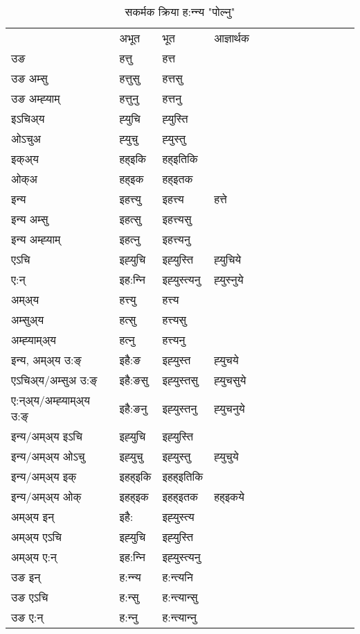 \begin{table}[H]
\label{utt.vt} \centering
\caption{सकर्मक क्रिया  ह:न्‍न्य  "पोल्नु"  }
\begin{tabular}{l|l|l|l|l|l|l|l|l|l|l|l|l}  \toprule
&अभूत & भूत & आज्ञार्थक \\ 
उङ &हत्तु &हत्त \\ 
उङ अम्सु&हत्तुसु &हत्तसु \\ 
उङ अम्ह्‍याम्&हत्तुनु &हत्तनु \\ 
इऽचिअ्य &ह्‍युचि &ह्‍युस्ति   \\ 
ओऽचुअ        &ह्‍युचु &ह्‍युस्तु   \\ 
इक्अ्य&हह्इकि &हह्इतिकि   \\ 
ओक्अ &हह्इक &हह्इतक   \\ 
इन्य & इहत्त्यु  & इहत्त्य &हत्ते  \\ 
इन्य अम्सु& इहत्सु  & इहत्त्यसु   \\ 
इन्य अम्ह्‍याम्& इहत्‍नु  & इहत्त्यनु   \\ 
एऽचि & इह्‍युचि & इह्‍युस्ति &ह्‍युचिये    \\ 
ए:न् & इह:न्‍नि  & इह्‍युस्त्यनु &ह्‍युस्‍नुये  \\ 
अम्अ्य & हत्त्यु  & हत्त्य  \\ 
अम्सुअ्य & हत्सु & हत्त्यसु  \\ 
अम्ह्‍याम्अ्य & हत्‍नु  & हत्त्यनु \\ 
\midrule
इन्य, अम्अ्य उ:ङ्‌ &इहै:ङ &इह्‍युस्त &ह्‍युचये \\ 
एऽचिअ्य/अम्सुअ उ:ङ्‌ &इहै:ङसु &इह्‍युस्तसु &ह्‍युचसुये \\ 
ए:न्अ्य/अम्ह्‍याम्अ्य उ:ङ्‌ &इहै:ङनु &इह्‍युस्तनु &ह्‍युचनुये \\ 
इन्य/अम्अ्य इऽचि &इह्‍युचि &इह्‍युस्ति    \\ 
इन्य/अम्अ्य ओऽचु &इह्‍युचु &इह्‍युस्तु  &ह्‍युचुये  \\ 
इन्य/अम्अ्य इक् &इहह्इकि &इहह्इतिकि   \\ 
इन्य/अम्अ्य ओक् &इहह्इक &इहह्इतक  &हह्इकये  \\ 
अम्अ्य इन् & इहै: & इह्‍युस्त्य   \\ 
अम्अ्य एऽचि & इह्‍युचि & इह्‍युस्ति    \\ 
अम्अ्य ए:न् & इह:न्‍नि  & इह्‍युस्त्यनु  \\ 
\midrule
उङ इन् & ह:न्‍न्य  & ह:न्त्यनि  \\ 
उङ एऽचि & ह:न्सु  & ह:न्त्यान्सु   \\ 
उङ ए:न्& ह:न्‍नु  & ह:न्त्यान्‍नु   \\ 
\bottomrule
\end{tabular}
\end{table}


